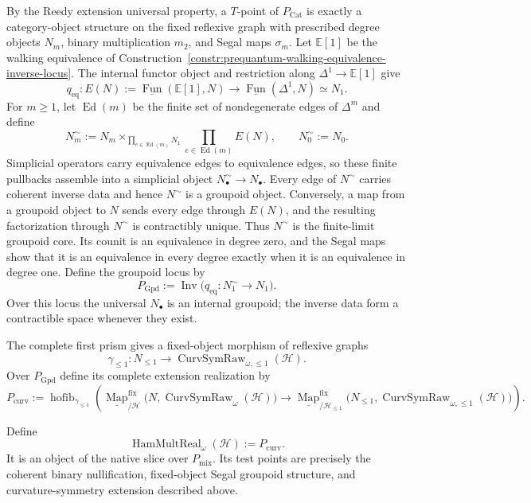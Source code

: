 By the Reedy extension universal property, a $T$-point of $P_{\mathrm{Cat}}$ is
exactly a category-object structure on the fixed reflexive graph with prescribed
degree objects $N_m$, binary multiplication $m_2$, and Segal maps $\sigma_m$.
Let $\mathbb E[1]$ be the walking equivalence of
Construction~\ref{constr:prequantum-walking-equivalence-inverse-locus}.  The
internal functor object and restriction along
$\Delta^1\to\mathbb E[1]$ give
\[
q_{\mathrm{eq}}:
E(N):=\underline{\operatorname{Fun}}(\mathbb E[1],N)
\longrightarrow
\underline{\operatorname{Fun}}(\Delta^1,N)\simeq N_1.
\]
For $m\ge1$, let $\operatorname{Ed}(m)$ be the finite set of nondegenerate
edges of $\Delta^m$ and define
\[
N_m^\sim
:=
N_m
\times_{\prod_{e\in\operatorname{Ed}(m)}N_1}
\prod_{e\in\operatorname{Ed}(m)}E(N),
\qquad
N_0^\sim:=N_0.
\]
Simplicial operators carry equivalence edges to equivalence edges, so these
finite pullbacks assemble into a simplicial object
$N_\bullet^\sim\to N_\bullet$.  Every edge of $N^\sim$ carries coherent inverse
data and hence $N^\sim$ is a groupoid object.  Conversely, a map from a groupoid
object to $N$ sends every edge through $E(N)$, and the resulting factorization
through $N^\sim$ is contractibly unique.  Thus $N^\sim$ is the finite-limit
groupoid core.  Its counit is an equivalence in degree zero, and the Segal maps
show that it is an equivalence in every degree exactly when it is an equivalence
in degree one.  Define the groupoid locus by
\[
\boxed{
P_{\mathrm{Gpd}}
:=
\operatorname{Inv}
\bigl(q_{\mathrm{eq}}:N_1^\sim\longrightarrow N_1\bigr).
}
\]
Over this locus the universal $N_\bullet$ is an internal groupoid; the inverse
data form a contractible space whenever they exist.

The complete first prism gives a fixed-object morphism of reflexive graphs
\[
\gamma_{\le1}:
N_{\le1}
\longrightarrow
\operatorname{CurvSymRaw}_{\omega,\le1}(\mathcal H).
\]
Over $P_{\mathrm{Gpd}}$ define its complete extension realization by
\[
\boxed{
P_{\mathrm{curv}}
:=
\operatorname{hofib}_{\gamma_{\le1}}
\left(
\underline{\operatorname{Map}}^{\mathrm{fix}}_{/\mathcal H}
\bigl(N,\operatorname{CurvSymRaw}_{\omega}(\mathcal H)\bigr)
\longrightarrow
\underline{\operatorname{Map}}^{\mathrm{fix}}_{/\mathcal H_{\le1}}
\bigl(N_{\le1},
\operatorname{CurvSymRaw}_{\omega,\le1}(\mathcal H)\bigr)
\right).
}
\]

\begin{definition}
\label{def:prequantum-complete-raw-hamiltonian-nerve}
Define
\[
\boxed{
\operatorname{HamMultReal}_{\omega}(\mathcal H)
:=P_{\mathrm{curv}}.
}
\]
It is an object of the native slice over $P_{\mathrm{mix}}$.  Its test points
are precisely the coherent binary nullification, fixed-object Segal groupoid
structure, and curvature-symmetry extension described above.
\end{definition}

